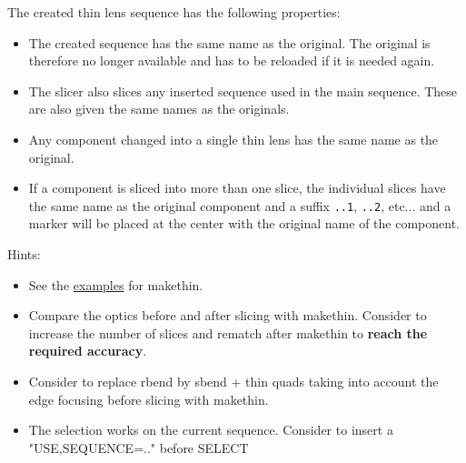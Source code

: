 The created thin lens sequence has the following properties: 
\begin{itemize}
   \item The created sequence has the same name as the original. The
     original is therefore no longer  available and has to be reloaded
     if it is needed again.   
   \item The slicer also slices any inserted sequence used in the main
     sequence. These are also given the same names as the originals.  
   \item Any component changed into a single thin lens has the same name
     as the original.  
   \item If a component is sliced into more than one slice, the
     individual slices have the same name as the original component and
     a suffix \texttt{..1}, \texttt{..2}, etc... and a marker  will be
     placed at the center with the original name of the component.  
\end{itemize} 
Hints: 
\begin{itemize}
   \item See the
     \href{http://cern.ch/frs/mad-X_examples/makethin/}{examples} for
     makethin.  
   \item Compare the optics before and after slicing with
     makethin. Consider to increase the number of slices and rematch
     after makethin to \textbf{reach the required accuracy}.  
   \item Consider to replace rbend by sbend + thin quads taking into
     account the edge focusing before slicing with makethin.  
   \item The selection works on the current sequence. Consider to insert
     a "USE,SEQUENCE=.." before SELECT  
\end{itemize}


